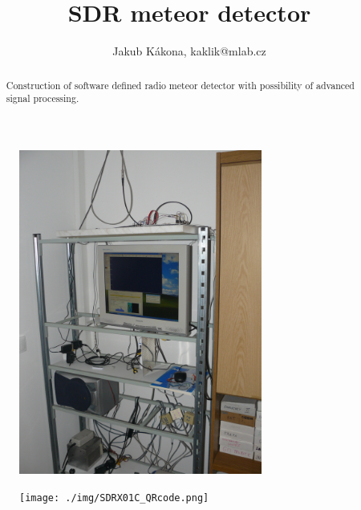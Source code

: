 \documentclass[12pt,a4paper,oneside]{article}
\begin{document}
\title{SDR meteor detector}
\author{Jakub Kákona, kaklik@mlab.cz }
\maketitle

\begin{abstract}
Construction of software defined radio meteor detector with possibility of advanced signal processing.
\end{abstract}

\begin{figure} [htbp]
\begin{center}
\includegraphics [width=80mm] {./img/meteor_detector_station.JPG} 
\end{center}
\end{figure}

\begin{figure} [b]
\texttt{[image: ./img/SDRX01C\_QRcode.png]} 
\end{figure}

\newpage
\tableofcontents
\end{document}
